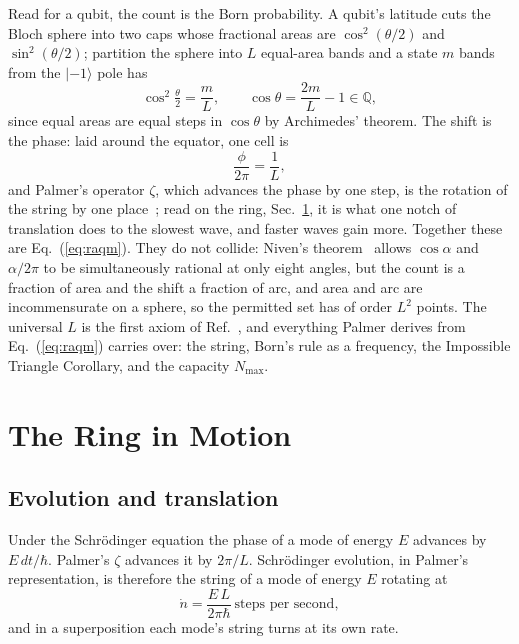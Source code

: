 \documentclass[aps,prd,twocolumn,superscriptaddress,nofootinbib]{revtex4-2}
\begin{document}
Read for a qubit, the count is the Born probability. A qubit's latitude cuts the Bloch sphere into two caps whose fractional areas are $\cos^2(\theta/2)$ and $\sin^2(\theta/2)$; partition the sphere into $L$ equal-area bands and a state $m$ bands from the $|{-1}\rangle$ pole has
\begin{equation}
\cos^2\tfrac{\theta}{2} = \frac{m}{L}, \qquad \cos\theta = \frac{2m}{L} - 1 \in \mathbb{Q},
\label{eq:count}
\end{equation}
since equal areas are equal steps in $\cos\theta$ by Archimedes' theorem. The shift is the phase: laid around the equator, one cell is
\begin{equation}
\frac{\phi}{2\pi} = \frac{1}{L},
\label{eq:shift}
\end{equation}
and Palmer's operator $\zeta$, which advances the phase by one step, is the rotation of the string by one place~\cite{palmer2026}; read on the ring, Sec.~\ref{sec:motion}, it is what one notch of translation does to the slowest wave, and faster waves gain more. Together these are Eq.~(\ref{eq:raqm}). They do not collide: Niven's theorem~\cite{niven1956,jahnel2010} allows $\cos\alpha$ and $\alpha/2\pi$ to be simultaneously rational at only eight angles, but the count is a fraction of area and the shift a fraction of arc, and area and arc are incommensurate on a sphere, so the permitted set has of order $L^2$ points. The universal $L$ is the first axiom of Ref.~\cite{korytko2026}, and everything Palmer derives from Eq.~(\ref{eq:raqm}) carries over: the string, Born's rule as a frequency, the Impossible Triangle Corollary, and the capacity $N_{\max}$.

\section{The Ring in Motion}
\label{sec:motion}

\subsection{Evolution and translation}

Under the Schr\"odinger equation the phase of a mode of energy $E$ advances by $E\,dt/\hbar$. Palmer's $\zeta$ advances it by $2\pi/L$. Schr\"odinger evolution, in Palmer's representation, is therefore the string of a mode of energy $E$ rotating at
\begin{equation}
\dot n = \frac{E\,L}{2\pi\hbar}\ \text{steps per second} ,
\label{eq:rate}
\end{equation}
and in a superposition each mode's string turns at its own rate. 
\end{document}
